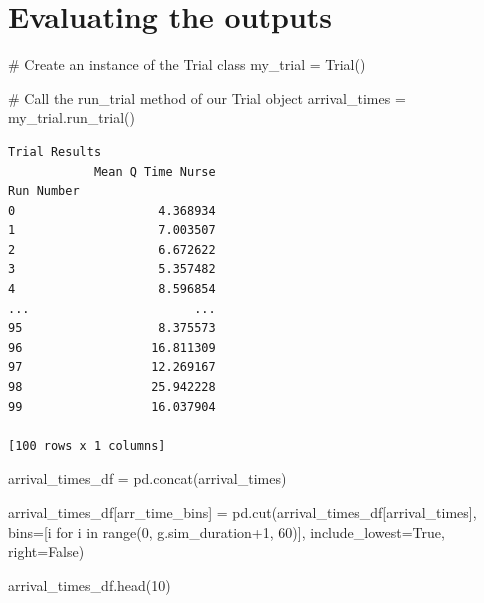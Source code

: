 \documentclass[
  letterpaper,
  DIV=11,
  numbers=noendperiod]{scrreprt}
\newenvironment{Shaded}{}{}
\newcommand{\BuiltInTok}[1]{\textcolor[rgb]{0.84,0.23,0.29}{#1}}
\newcommand{\CommentTok}[1]{\textcolor[rgb]{0.42,0.45,0.49}{#1}}
\newcommand{\ControlFlowTok}[1]{\textcolor[rgb]{0.84,0.23,0.29}{#1}}
\newcommand{\DecValTok}[1]{\textcolor[rgb]{0.00,0.36,0.77}{#1}}
\newcommand{\KeywordTok}[1]{\textcolor[rgb]{0.84,0.23,0.29}{#1}}
\newcommand{\NormalTok}[1]{\textcolor[rgb]{0.14,0.16,0.18}{#1}}
\newcommand{\OperatorTok}[1]{\textcolor[rgb]{0.14,0.16,0.18}{#1}}
\newcommand{\StringTok}[1]{\textcolor[rgb]{0.01,0.18,0.38}{#1}}
\newcommand{\VariableTok}[1]{\textcolor[rgb]{0.89,0.38,0.04}{#1}}
\begin{document}
\section{Evaluating the outputs}\label{evaluating-the-outputs-5}

\begin{Shaded}
\begin{Highlighting}[]
\CommentTok{\# Create an instance of the Trial class}
\NormalTok{my\_trial }\OperatorTok{=}\NormalTok{ Trial()}

\CommentTok{\# Call the run\_trial method of our Trial object}
\NormalTok{arrival\_times }\OperatorTok{=}\NormalTok{ my\_trial.run\_trial()}
\end{Highlighting}
\end{Shaded}

\begin{verbatim}
Trial Results
            Mean Q Time Nurse
Run Number                   
0                    4.368934
1                    7.003507
2                    6.672622
3                    5.357482
4                    8.596854
...                       ...
95                   8.375573
96                  16.811309
97                  12.269167
98                  25.942228
99                  16.037904

[100 rows x 1 columns]
\end{verbatim}

\begin{Shaded}
\begin{Highlighting}[]
\NormalTok{arrival\_times\_df }\OperatorTok{=}\NormalTok{ pd.concat(arrival\_times)}

\NormalTok{arrival\_times\_df[}\StringTok{\textquotesingle{}arr\_time\_bins\textquotesingle{}}\NormalTok{] }\OperatorTok{=}\NormalTok{ pd.cut(arrival\_times\_df[}\StringTok{\textquotesingle{}arrival\_times\textquotesingle{}}\NormalTok{], bins}\OperatorTok{=}\NormalTok{[i }\ControlFlowTok{for}\NormalTok{ i }\KeywordTok{in} \BuiltInTok{range}\NormalTok{(}\DecValTok{0}\NormalTok{, g.sim\_duration}\OperatorTok{+}\DecValTok{1}\NormalTok{, }\DecValTok{60}\NormalTok{)], include\_lowest}\OperatorTok{=}\VariableTok{True}\NormalTok{, right}\OperatorTok{=}\VariableTok{False}\NormalTok{)}

\NormalTok{arrival\_times\_df.head(}\DecValTok{10}\NormalTok{)}
\end{Highlighting}
\end{Shaded}
\end{document}
